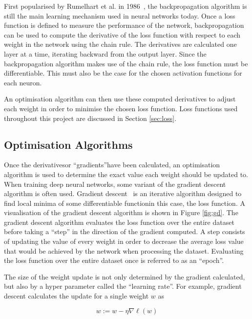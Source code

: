 First popularised by Rumelhart et al. in 1986~\cite{rumelhart}, the backpropagation algorithm is still the main learning mechanism used in neural networks today. Once a loss function is defined to measure the performance of the network, backpropagation can be used to compute the derivative of the loss function with respect to each weight in the network using the chain rule. The derivatives are calculated one layer at a time, iterating backward from the output layer. Since the backpropagation algorithm makes use of the chain rule, the loss function must be differentiable. This must also be the case for the chosen activation functions for each neuron.

An optimisation algorithm can then use these computed derivatives to adjust each weight in order to minimise the chosen loss function. Loss functions used throughout this project are discussed in Section \ref{sec:loss}.

\subsection{Optimisation Algorithms}

Once the derivatives\textemdash or ``gradients''\textemdash have been calculated, an optimisation algorithm is used to determine the exact value each weight should be updated to. When training deep neural networks, some variant of the gradient descent algorithm is often used. Gradient descent~\cite[p. 536]{gradient} is an iterative algorithm designed to find local minima of some differentiable function\textemdash in this case, the loss function. A visualisation of the gradient descent algorithm is shown in Figure \ref{fig:gd}. The gradient descent algorithm evaluates the loss function over the entire dataset before taking a ``step'' in the direction of the gradient computed. A step consists of updating the value of every weight in order to decrease the average loss value that would be achieved by the network when processing the dataset. Evaluating the loss function over the entire dataset once is referred to as an ``epoch''.

The size of the weight update is not only determined by the gradient calculated, but also by a hyper parameter called the ``learning rate''. For example, gradient descent calculates the update for a single weight $w$ as

\begin{equation}
    w := w - \eta\nabla\ell(w)
\end{equation}

